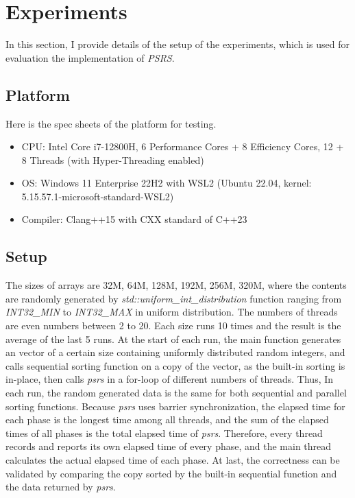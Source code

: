 \documentclass[11pt]{article}
\begin{document}
    \section{Experiments}
    \label{sec:section_2}
    In this section, I provide details of the setup of the experiments, which is used for evaluation the implementation of \textit{PSRS}.

    \subsection{Platform}
    \label{subsec:section_2_1}
    Here is the spec sheets of the platform for testing.
    \begin{itemize}
        \item CPU: Intel Core i7-12800H, 6 Performance Cores + 8 Efficiency Cores, 12 + 8 Threads (with Hyper-Threading enabled)
        \item OS: Windows 11 Enterprise 22H2 with WSL2 (Ubuntu 22.04, kernel: 5.15.57.1-microsoft-standard-WSL2)
        \item Compiler: Clang++15 with CXX standard of C++23
    \end{itemize}

    \subsection{Setup}
    \label{subsec:section-2-2}
    The sizes of arrays are 32M, 64M, 128M, 192M, 256M, 320M, where the contents are randomly generated by \textit{std::uniform\_int\_distribution} function ranging from \textit{INT32\_MIN} to \textit{INT32\_MAX} in uniform distribution.
    The numbers of threads are even numbers between 2 to 20.
    Each size runs 10 times and the result is the average of the last 5 runs.
    At the start of each run, the main function generates an vector of a certain size containing uniformly distributed random integers, and calls sequential sorting function on a copy of the vector, as the built-in sorting is in-place, then calls \textit{psrs} in a for-loop of different numbers of threads.
    Thus, In each run, the random generated data is the same for both sequential and parallel sorting functions.
    Because \textit{psrs} uses barrier synchronization, the elapsed time for each phase is the longest time among all threads, and the sum of the elapsed times of all phases is the total elapsed time of \textit{psrs}.
    Therefore, every thread records and reports its own elapsed time of every phase, and the main thread calculates the actual elapsed time of each phase.
    At last, the correctness can be validated by comparing the copy sorted by the built-in sequential function and the data returned by \textit{psrs}.
\end{document}
